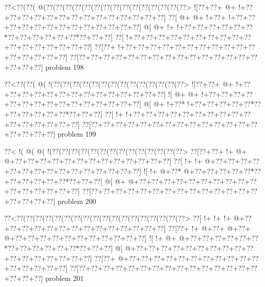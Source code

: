 \vbox{\vbox{\goo
\0??<\0??(\0??(\- @(\0??(\0??(\0??(\0??(\0??(\0??(\0??(\0??(\0??(\0??(\0??(\0??(\0??(\0??(\0??>
\- ![\0??+\0??+\- @+\- !+\0??+\0??+\0??+\0??+\0??+\0??+\0??+\0??+\0??+\0??+\0??+\0??+\0??+\0??]
\0??[\- @+\- @+\- !+\0??+\- !+\0??+\0??+\0??+\0??+\0??+\0??+\0??+\0??+\0??+\0??+\0??+\0??+\0??]
\- @[\- @+\- !+\- !+\0??+\0??+\0??+\0??+\0??+\0??*\0??+\0??+\0??+\0??+\0??+\0??*\0??+\0??+\0??]
\0??[\- !+\0??+\0??+\0??+\0??+\0??+\0??+\0??+\0??+\0??+\0??+\0??+\0??+\0??+\0??+\0??+\0??+\0??]
\0??[\0??+\- !+\0??+\0??+\0??+\0??+\0??+\0??+\0??+\0??+\0??+\0??+\0??+\0??+\0??+\0??+\0??+\0??]
\0??[\0??+\0??+\0??+\0??+\0??+\0??+\0??+\0??+\0??+\0??+\0??+\0??+\0??+\0??+\0??+\0??+\0??+\0??]
}
\hfil problem 198\hfil\break
}



\vbox{\vbox{\goo
\0??<\0??(\0??(\- @(\- !(\0??(\0??(\0??(\0??(\0??(\0??(\0??(\0??(\0??(\0??(\0??(\0??(\0??(\0??>
\- ![\0??+\0??+\- @+\- !+\0??+\0??+\0??+\0??+\0??+\0??+\0??+\0??+\0??+\0??+\0??+\0??+\0??+\0??]
\- ![\- @+\- @+\- !+\0??+\0??+\0??+\0??+\0??+\0??+\0??+\0??+\0??+\0??+\0??+\0??+\0??+\0??+\0??]
\- @[\- @+\- !+\0??*\- !+\0??+\0??+\0??+\0??+\0??*\0??+\0??+\0??+\0??+\0??+\0??*\0??+\0??+\0??]
\0??[\- !+\- !+\0??+\0??+\0??+\0??+\0??+\0??+\0??+\0??+\0??+\0??+\0??+\0??+\0??+\0??+\0??+\0??]
\0??[\0??+\0??+\0??+\0??+\0??+\0??+\0??+\0??+\0??+\0??+\0??+\0??+\0??+\0??+\0??+\0??+\0??+\0??]
}
\hfil problem 199\hfil\break
}



\vbox{\vbox{\goo
\0??<\- !(\- @(\- @(\- !(\0??(\0??(\0??(\0??(\0??(\0??(\0??(\0??(\0??(\0??(\0??(\0??(\0??(\0??>
\0??[\0??+\0??+\- !+\- @+\- @+\0??+\0??+\0??+\0??+\0??+\0??+\0??+\0??+\0??+\0??+\0??+\0??+\0??]
\0??[\- !+\- !+\- @+\0??+\0??+\0??+\0??+\0??+\0??+\0??+\0??+\0??+\0??+\0??+\0??+\0??+\0??+\0??]
\- ![\- !+\- @+\0??*\- @+\0??+\0??+\0??+\0??+\0??*\0??+\0??+\0??+\0??+\0??+\0??*\0??+\0??+\0??]
\- @[\- @+\- @+\0??+\0??+\0??+\0??+\0??+\0??+\0??+\0??+\0??+\0??+\0??+\0??+\0??+\0??+\0??+\0??]
\0??[\0??+\0??+\0??+\0??+\0??+\0??+\0??+\0??+\0??+\0??+\0??+\0??+\0??+\0??+\0??+\0??+\0??+\0??]
}
\hfil problem 200\hfil\break
}



\vbox{\vbox{\goo
\0??<\0??(\0??(\0??(\0??(\0??(\0??(\0??(\0??(\0??(\0??(\0??(\0??(\0??(\0??(\0??(\0??(\0??(\0??>
\0??[\- !+\- !+\- !+\- @+\0??+\0??+\0??+\0??+\0??+\0??+\0??+\0??+\0??+\0??+\0??+\0??+\0??+\0??]
\0??[\0??+\- !+\- @+\0??+\- @+\0??+\- @+\0??+\0??+\0??+\0??+\0??+\0??+\0??+\0??+\0??+\0??+\0??]
\- ![\- !+\- @+\- @+\0??+\0??+\0??+\0??+\0??+\0??*\0??+\0??+\0??+\0??+\0??+\0??*\0??+\0??+\0??]
\- @[\- @+\0??+\0??+\0??+\0??+\0??+\0??+\0??+\0??+\0??+\0??+\0??+\0??+\0??+\0??+\0??+\0??+\0??]
\0??[\0??+\- @+\0??+\0??+\0??+\0??+\0??+\0??+\0??+\0??+\0??+\0??+\0??+\0??+\0??+\0??+\0??+\0??]
\0??[\0??+\0??+\0??+\0??+\0??+\0??+\0??+\0??+\0??+\0??+\0??+\0??+\0??+\0??+\0??+\0??+\0??+\0??]
}
\hfil problem 201\hfil\break
}



